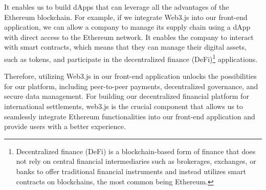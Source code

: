 It enables us to build dApps that can leverage all the advantages of the Ethereum blockchain. For example, if we integrate Web3.js into our front-end application,
we can allow a company to manage its supply chain using a dApp with direct access to the Ethereum network. It enables the company to
interact with smart contracts, which means that they can manage their digital assets, such as tokens,  and participate in the decentralized finance (DeFi)\footnote{
   Decentralized finance (DeFi) is a blockchain-based form of finance that does not rely on central financial intermediaries such as brokerages,
   exchanges, or banks to offer traditional financial instruments and instead utilizes smart contracts on blockchains, the most common being Ethereum.} applications.


Therefore, utilizing Web3.js in our front-end application unlocks the possibilities for our platform, including peer-to-peer payments, decentralized
governance, and secure data management. For building our decentralized financial platform for international settlements, web3.js is the crucial component that allows us to
seamlessly integrate Ethereum functionalities into our front-end application and provide users with a better experience.









